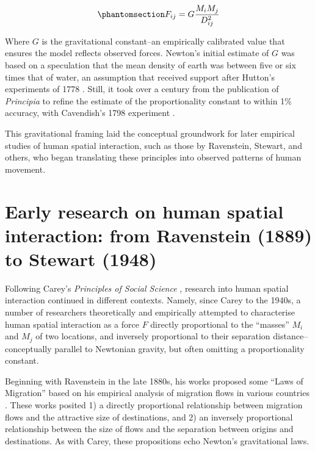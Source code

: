 \documentclass[
  10pt,
  letterpaper,
]{article}
\begin{document}
\begin{equation}\phantomsection\label{eq-phys-grav}{
F_{ij} = G \frac{M_i M_j} {D_{ij}^{2}}
}\end{equation}

Where \(G\) is the gravitational constant--an empirically calibrated
value that ensures the model reflects observed forces. Newton's initial
estimate of \(G\) was based on a speculation that the mean density of
earth was between five or six times that of water, an assumption that
received support after Hutton's experiments of 1778
\citep[p.~783]{hutton_xxxiii_1778}. Still, it took over a century from
the publication of \emph{Principia} to refine the estimate of the
proportionality constant to within 1\% accuracy, with Cavendish's 1798
experiment \citep{cavendish_xxi_1798}.

This gravitational framing laid the conceptual groundwork for later
empirical studies of human spatial interaction, such as those by
Ravenstein, Stewart, and others, who began translating these principles
into observed patterns of human movement.

\section{Early research on human spatial interaction: from Ravenstein
(1889) to Stewart
(1948)}\label{early-research-on-human-spatial-interaction-from-ravenstein-1889-to-stewart-1948}

Following Carey's \emph{Principles of Social Science}
\citep{careyPrinciplesSocialScience1858}, research into human spatial
interaction continued in different contexts. Namely, since Carey to the
1940s, a number of researchers theoretically and empirically attempted
to characterise human spatial interaction as a force \(F\) directly
proportional to the ``masses'' \(M_i\) and \(M_j\) of two locations, and
inversely proportional to their separation distance--conceptually
parallel to Newtonian gravity, but often omitting a proportionality
constant.

Beginning with Ravenstein in the late 1880s, his works proposed some
``Laws of Migration'' based on his empirical analysis of migration flows
in various countries
\citep{ravensteinLawsMigration1885, ravensteinLawsMigration1889}. These
works posited 1) a directly proportional relationship between migration
flows and the attractive size of destinations, and 2) an inversely
proportional relationship between the size of flows and the separation
between origins and destinations. As with Carey, these propositions echo
Newton's gravitational laws.
\end{document}
